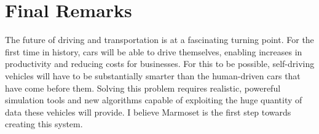 \documentclass[ %
                    author={Alexander Hill},
                supervisor={Dr. Benjamin Sach},
                    degree={MEng},
                     title={MARMOSET},
                  subtitle={Multi-Agent Route Management using Online Simulation for Efficient Transportation},
                      type={research},
                      year={2016} ]{dissertation}
\begin{document}
\section{Final Remarks}

The future of driving and transportation is at a fascinating turning point. For
the first time in history, cars will be able to drive themselves, enabling
increases in productivity and reducing costs for businesses. For this to be
possible, self-driving vehicles will have to be substantially smarter than the
human-driven cars that have come before them. Solving this problem requires
realistic, powereful simulation tools and new algorithms capable of exploiting the
huge quantity of data these vehicles will provide. I believe Marmoset is the
first step towards creating this system.


%
%

\backmatter







\end{document}

